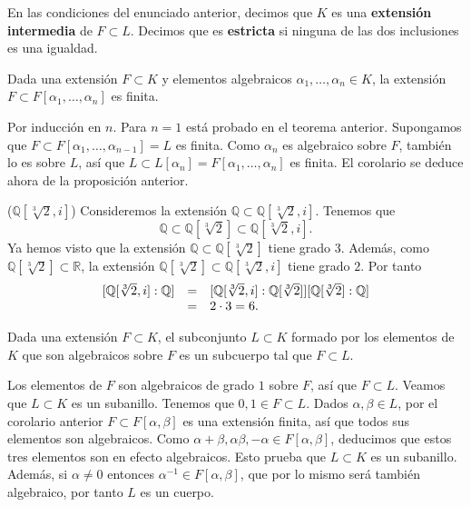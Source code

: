 
En las condiciones del enunciado anterior, decimos que \(K\) es una
\textbf{extensión intermedia} de \(F\subset L\). Decimos que es
\textbf{estricta} si ninguna de las dos inclusiones es una igualdad.


Dada una extensión \(F\subset K\) y elementos algebraicos
\(\alpha_1,\dots,\alpha_n\in K\), la extensión
\(F\subset F[\alpha_1,\dots,\alpha_n]\) es finita. 


Por inducción en \(n\). Para \(n=1\) está probado en el teorema
anterior. Supongamos que \(F\subset F[\alpha_1,\dots,\alpha_{n-1}]=L\)
es finita. Como \(\alpha_n\) es algebraico sobre \(F\), también lo es
sobre \(L\), así que
\(L\subset L[\alpha_n]=F[\alpha_1,\dots,\alpha_n]\) es finita. El
corolario se deduce ahora de la proposición anterior. 

\textrm{\normalfont ($\mathbb Q[\sqrt[3]{2},i]$)}
Consideremos la extensión \(\mathbb Q\subset\mathbb Q[\sqrt[3]{2},i]\).
Tenemos que
\[\mathbb Q\subset\mathbb Q[\sqrt[3]{2}]\subset\mathbb Q[\sqrt[3]{2},i].\]
Ya hemos visto que la extensión
\(\mathbb Q\subset\mathbb Q[\sqrt[3]{2}]\) tiene grado \(3\). Además,
como \(\mathbb Q[\sqrt[3]{2}]\subset\mathbb R\), la extensión
\(\mathbb Q[\sqrt[3]{2}]\subset\mathbb Q[\sqrt[3]{2},i]\) tiene grado
\(2\). Por tanto
\[\begin{array}{rcl}[\mathbb Q[\sqrt[3]{2},i]:\mathbb Q]&=&[\mathbb Q[\sqrt[3]{2},i]:\mathbb Q[\sqrt[3]{2}]][\mathbb Q[\sqrt[3]{2}]:\mathbb Q]\cr &=&2\cdot 3=6.\end{array}\]


Dada una extensión \(F\subset K\), el subconjunto \(L\subset K\) formado
por los elementos de \(K\) que son algebraicos sobre \(F\) es un
subcuerpo tal que \(F\subset L\). 


Los elementos de \(F\) son algebraicos de grado \(1\) sobre \(F\), así
que \(F\subset L\). Veamos que \(L\subset K\) es un subanillo. Tenemos
que \(0,1\in F\subset L\). Dados \(\alpha,\beta\in L\), por el corolario
anterior \(F\subset F[\alpha,\beta]\) es una extensión finita, así que
todos sus elementos son algebraicos. Como
\(\alpha+\beta,\alpha\beta,-\alpha\in F[\alpha,\beta]\), deducimos que
estos tres elementos son en efecto algebraicos. Esto prueba que
\(L\subset K\) es un subanillo. Además, si \(\alpha\neq 0\) entonces
\(\alpha^{-1}\in F[\alpha,\beta]\), que por lo mismo será también
algebraico, por tanto \(L\) es un cuerpo. 

